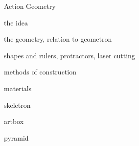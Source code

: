 Action Geometry

the idea

the geometry, relation to geometron

shapes and rulers, protractors, laser cutting

methods of construction

materials

skeletron

artbox

pyramid

